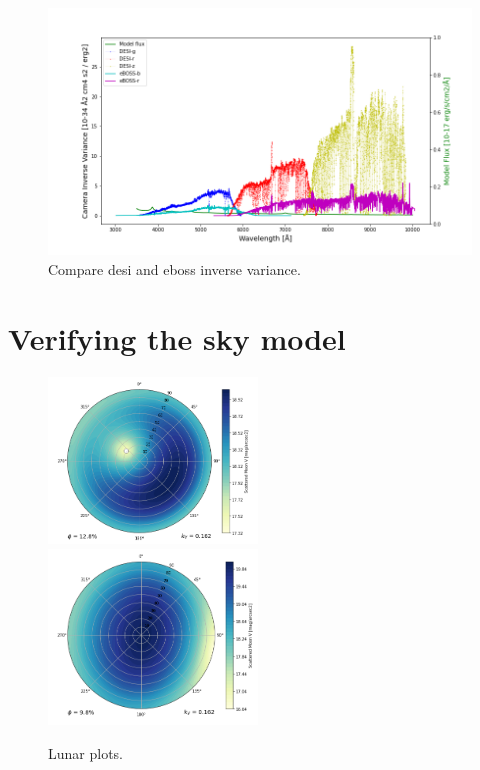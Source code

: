 \begin{figure}[h]
\centering
\includegraphics[width=16cm]{images/specsim/ivar_comparison.png}
\caption{Compare desi and eboss inverse variance.}
\label{fig:ivar_comparison}
\end{figure}

\section{Verifying the  sky model}


\begin{figure}[h]
    \centering
    \includegraphics[width=0.495\textwidth]{images/specsim/lunar_plot_zen_21.21_az_307.76_ph_0.13.png}
    \includegraphics[width=0.495\textwidth]{images/specsim/lunar_plot_zen_97.31_az_100.50_ph_0.10.png}
    \caption{Lunar plots.}
    \label{fig:lunar}
\end{figure}

